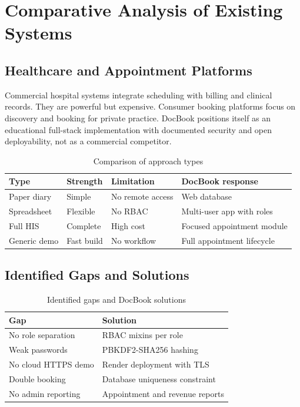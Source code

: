 \section{Comparative Analysis of Existing Systems}

\subsection{Healthcare and Appointment Platforms}

Commercial hospital systems integrate scheduling with billing and clinical records. They are powerful but expensive. Consumer booking platforms focus on discovery and booking for private practice. DocBook positions itself as an educational full-stack implementation with documented security and open deployability, not as a commercial competitor.

\begin{table}[htbp]
  \centering
  \caption{Comparison of approach types}
  \label{tab:approach-types}
  \begin{tabular}{@{}p{2.2cm}p{3.2cm}p{3.2cm}p{4.5cm}@{}}
    \toprule
    Type & Strength & Limitation & DocBook response \\
    \midrule
    Paper diary & Simple & No remote access & Web database \\
    Spreadsheet & Flexible & No RBAC & Multi-user app with roles \\
    Full HIS & Complete & High cost & Focused appointment module \\
    Generic demo & Fast build & No workflow & Full appointment lifecycle \\
    \bottomrule
  \end{tabular}
\end{table}

\subsection{Identified Gaps and Solutions}

\begin{table}[htbp]
  \centering
  \caption{Identified gaps and DocBook solutions}
  \label{tab:gaps}
  \begin{tabular}{@{}p{5.5cm}p{7cm}@{}}
    \toprule
    Gap & Solution \\
    \midrule
    No role separation & RBAC mixins per role \\
    Weak passwords & PBKDF2-SHA256 hashing \\
    No cloud HTTPS demo & Render deployment with TLS \\
    Double booking & Database uniqueness constraint \\
    No admin reporting & Appointment and revenue reports \\
    \bottomrule
  \end{tabular}
\end{table}
